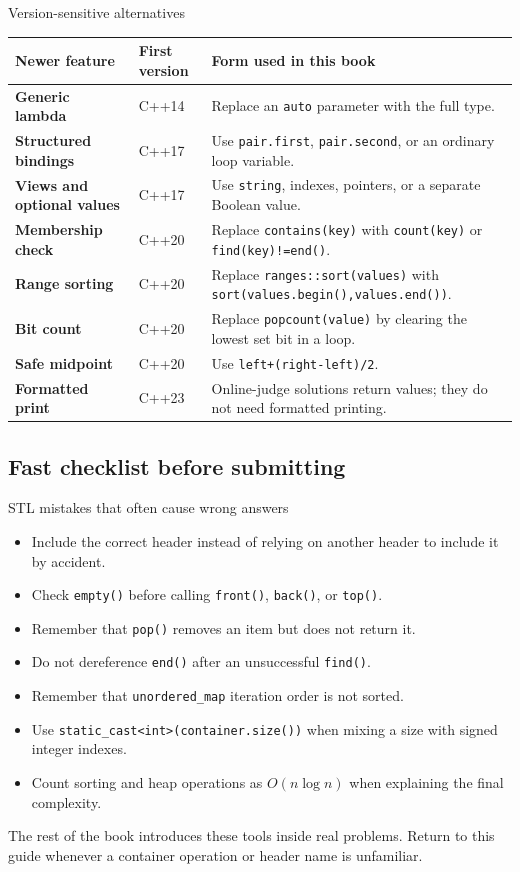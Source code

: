 \begin{revisionbox}{Version-sensitive alternatives}
\small
\setlength{\tabcolsep}{3pt}
\begin{tabularx}{\linewidth}{@{}>{\raggedright\arraybackslash\bfseries}p{2.7cm}
  >{\centering\arraybackslash}p{1.5cm}
  >{\raggedright\arraybackslash}X@{}}
\toprule
Newer feature & First version & Form used in this book \\
\midrule
Generic lambda & C++14 & Replace an \texttt{auto} parameter with the full type. \\
Structured bindings & C++17 & Use \texttt{pair.first}, \texttt{pair.second},
or an ordinary loop variable. \\
Views and optional values & C++17 & Use \texttt{string}, indexes, pointers, or a
separate Boolean value. \\
Membership check & C++20 & Replace \texttt{contains(key)} with \texttt{count(key)} or
\texttt{find(key)!=end()}. \\
Range sorting & C++20 & Replace \texttt{ranges::sort(values)} with
\texttt{sort(values.begin(),values.end())}. \\
Bit count & C++20 & Replace \texttt{popcount(value)} by clearing the lowest set bit in a loop. \\
Safe midpoint & C++20 & Use \texttt{left+(right-left)/2}. \\
Formatted print & C++23 & Online-judge solutions return values; they do not need
formatted printing. \\
\bottomrule
\end{tabularx}
\end{revisionbox}

\subsection{Fast checklist before submitting}

\begin{revisionbox}{STL mistakes that often cause wrong answers}
\begin{itemize}
  \item Include the correct header instead of relying on another header to
  include it by accident.
  \item Check \texttt{empty()} before calling \texttt{front()}, \texttt{back()},
  or \texttt{top()}.
  \item Remember that \texttt{pop()} removes an item but does not return it.
  \item Do not dereference \texttt{end()} after an unsuccessful \texttt{find()}.
  \item Remember that \texttt{unordered\_map} iteration order is not sorted.
  \item Use \texttt{static\_cast<int>(container.size())} when mixing a size with
  signed integer indexes.
  \item Count sorting and heap operations as $O(n\log n)$ when explaining the
  final complexity.
\end{itemize}
\end{revisionbox}

The rest of the book introduces these tools inside real problems. Return to
this guide whenever a container operation or header name is unfamiliar.